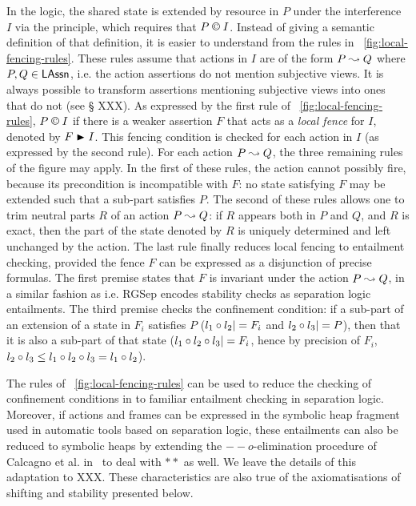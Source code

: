 In the logic, the shared state is extended by resource in $P$ under
the interference $I$ via the \extendRule principle, which requires
that $P\containI I$. Instead of giving a semantic definition of that
definition, it is easier to understand from the rules in
\fig~\ref{fig:local-fencing-rules}. These rules assume that actions in
$I$ are of the form $P \mathrel{\leadsto} Q$ where
$P,Q\in\mathsf{LAssn}$, i.e. the action assertions do not
mention subjective views. It is always possible to transform
assertions mentioning subjective views into ones that do not (see \S
XXX). As expressed by the first rule of
\fig~\ref{fig:local-fencing-rules}, $P\containI I$ if there is a
weaker assertion $F$ that acts as a \emph{local fence} for $I$,
denoted by $F\strictfences I$. This fencing condition is checked for
each action in $I$ (as expressed by the second rule). For each action
$P\mathrel{\leadsto} Q$, the three remaining rules of the figure may apply. In the
first of these rules, the action cannot possibly fire, because its
precondition is incompatible with $F$: no state satisfying $F$ may be
extended such that a sub-part satisfies $P$. The second of these rules
allows one to trim neutral parts $R$ of an action $P\mathrel{\leadsto} Q$: if $R$
appears both in $P$ and $Q$, and $R$ is exact, then the part of the
state denoted by $R$ is uniquely determined and left unchanged by the
action. The last rule finally reduces local fencing to entailment
checking, provided the fence $F$ can be expressed as a disjunction of
precise formulas. The first premise states that $F$ is invariant under
the action $P\mathrel{\leadsto} Q$, in a similar fashion as i.e. RGSep
encodes stability checks as separation logic entailments. The third
premise checks the confinement condition: if a sub-part of an
extension of a state in $F_i$ satisfies $P$ ($l_1\circ l_2|= F_i$
and $l_2\circ l_3 |= P$), then that it is also a sub-part of that
state ($l_1\circ l_2\circ l_3|=F_i$, hence by precision of
$F_i$, $l_2\circ l_3\leq l_1\circ l_2\circ l_3 =
l_1\circ l_2$).

The rules of \fig~\ref{fig:local-fencing-rules} can be used to reduce
the checking of confinement conditions in \colosl to familiar
entailment checking in separation logic. Moreover, if actions and
frames can be expressed in the symbolic heap fragment used in
automatic tools based on separation logic, these entailments can also
be reduced to symbolic heaps by extending the $--o$-elimination
procedure of Calcagno et al. in~\cite{vv07msc} to deal with $**$ as
well. We leave the details of this adaptation to XXX. These
characteristics are also true of the axiomatisations of shifting and
stability presented below.

